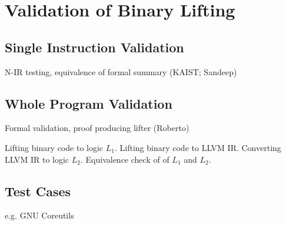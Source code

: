 
\section{Validation of Binary Lifting}
\label{sec:validation_of_binary_lifting}


\subsection{Single Instruction Validation}

N-IR testing, equivalence of formal summary (KAIST; Sandeep)


\subsection{Whole Program Validation}

Formal validation, proof producing lifter (Roberto)

Lifting binary code to logic $L_1$.
Lifting binary code to LLVM IR.
Converting LLVM IR to logic $L_2$.
Equivalence check of of $L_1$ and $L_2$.



\subsection{Test Cases}

e.g. GNU Coreutils
